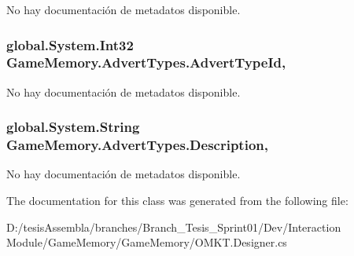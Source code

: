 No hay documentación de metadatos disponible. 

\hypertarget{class_game_memory_1_1_advert_types_ac21bad53ca69cb06497c450799dbeb43}{
\subsubsection[{Advert\-Type\-Id}]{\setlength{\rightskip}{0pt plus 5cm}global.\-System.\-Int32 Game\-Memory.\-Advert\-Types.\-Advert\-Type\-Id\hspace{0.3cm}{\ttfamily [get]}, {\ttfamily [set]}}}\label{class_game_memory_1_1_advert_types_ac21bad53ca69cb06497c450799dbeb43}


No hay documentación de metadatos disponible. 

\hypertarget{class_game_memory_1_1_advert_types_af676476a49a59ae0784817869e6f0a26}{
\subsubsection[{Description}]{\setlength{\rightskip}{0pt plus 5cm}global.\-System.\-String Game\-Memory.\-Advert\-Types.\-Description\hspace{0.3cm}{\ttfamily [get]}, {\ttfamily [set]}}}\label{class_game_memory_1_1_advert_types_af676476a49a59ae0784817869e6f0a26}


No hay documentación de metadatos disponible. 



The documentation for this class was generated from the following file\-:\begin{DoxyCompactItemize}
\item 
D\-:/tesis\-Assembla/branches/\-Branch\-\_\-\-Tesis\-\_\-\-Sprint01/\-Dev/\-Interaction Module/\-Game\-Memory/\-Game\-Memory/O\-M\-K\-T.\-Designer.\-cs\end{DoxyCompactItemize}
